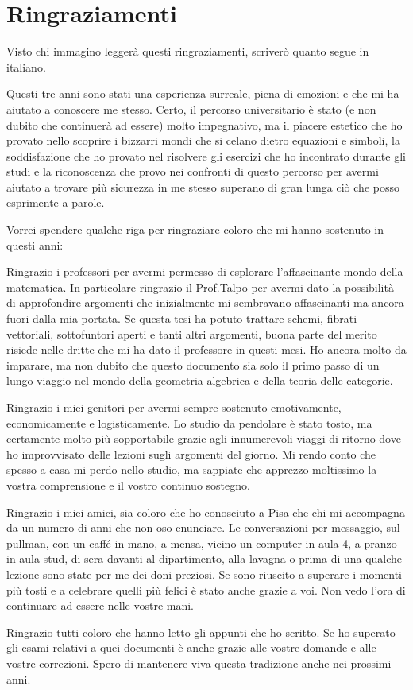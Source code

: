 \chapter*{Ringraziamenti}
Visto chi immagino legger\`a questi ringraziamenti, scriver\`o quanto segue in italiano.\medskip

Questi tre anni sono stati una esperienza surreale, piena di emozioni e che mi ha aiutato a conoscere me stesso. Certo, il percorso universitario \`e stato (e non dubito che continuer\`a ad essere) molto impegnativo, ma il piacere estetico che ho provato nello scoprire i bizzarri mondi che si celano dietro equazioni e simboli, la soddisfazione che ho provato nel risolvere gli esercizi che ho incontrato durante gli studi e la riconoscenza che provo nei confronti di questo percorso per avermi aiutato a trovare pi\`u sicurezza in me stesso superano di gran lunga ci\`o che posso esprimente a parole.
\bigskip

\noindent
Vorrei spendere qualche riga per ringraziare coloro che mi hanno sostenuto in questi anni:
\smallskip

Ringrazio i professori per avermi permesso di esplorare l'affascinante mondo della matematica. In particolare ringrazio il Prof.Talpo per avermi dato la possibilit\`a di approfondire argomenti che inizialmente mi sembravano affascinanti ma ancora fuori dalla mia portata. Se questa tesi ha potuto trattare schemi, fibrati vettoriali, sottofuntori aperti e tanti altri argomenti, buona parte del merito risiede nelle dritte che mi ha dato il professore in questi mesi. Ho ancora molto da imparare, ma non dubito che questo documento sia solo il primo passo di un lungo viaggio nel mondo della geometria algebrica e della teoria delle categorie.
\smallskip

Ringrazio i miei genitori per avermi sempre sostenuto emotivamente, economicamente e logisticamente. Lo studio da pendolare \`e stato tosto, ma certamente molto pi\`u sopportabile grazie agli innumerevoli viaggi di ritorno dove ho improvvisato delle lezioni sugli argomenti del giorno. Mi rendo conto che spesso a casa mi perdo nello studio, ma sappiate che apprezzo moltissimo la vostra comprensione e il vostro continuo sostegno.
\smallskip

Ringrazio i miei amici, sia coloro che ho conosciuto a Pisa che chi mi accompagna da un numero di anni che non oso enunciare. Le conversazioni per messaggio, sul pullman, con un caff\'e in mano, a mensa, vicino un computer in aula 4, a pranzo in aula stud, di sera davanti al dipartimento, alla lavagna o prima di una qualche lezione sono state per me dei doni preziosi. Se sono riuscito a superare i momenti pi\`u tosti e a celebrare quelli pi\`u felici \`e stato anche grazie a voi. Non vedo l'ora di continuare ad essere nelle vostre mani.
\smallskip

Ringrazio tutti coloro che hanno letto gli appunti che ho scritto. Se ho superato gli esami relativi a quei documenti \`e anche grazie alle vostre domande e alle vostre correzioni. Spero di mantenere viva questa tradizione anche nei prossimi anni.